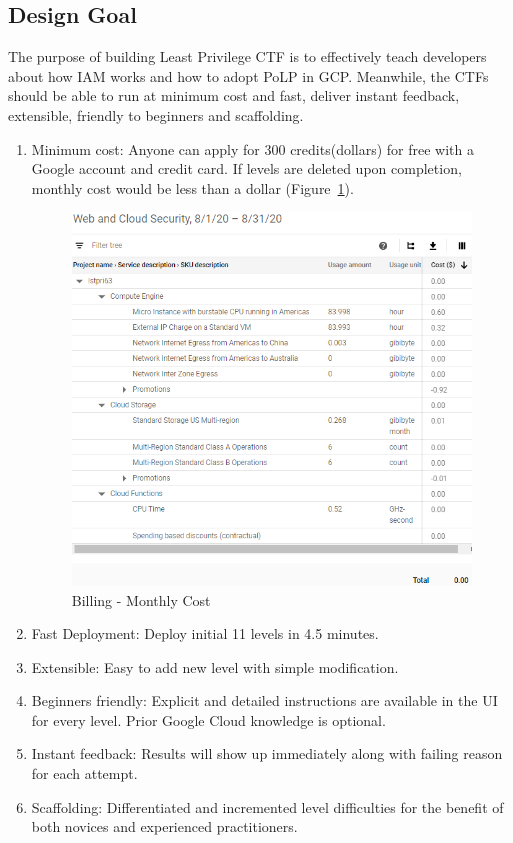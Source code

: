 \subsection{Design Goal}
The purpose of building Least Privilege CTF is to effectively teach developers about how IAM works and how to adopt PoLP in GCP. Meanwhile, the CTFs should be able to run at minimum cost and fast, deliver instant feedback, extensible, friendly to beginners and scaffolding.
\begin{enumerate}
\item Minimum cost: Anyone can apply for 300 credits(dollars) for free with a Google account and credit card. If levels are deleted upon completion, monthly cost would be less than a dollar (Figure~\ref{fig:cost}). 
\begin{figure}[!h]
  \centering
  \includegraphics[width=\linewidth]{pic/cost}
  \caption {Billing - Monthly Cost}
  \label{fig:cost}
\end{figure}
\item Fast Deployment:  Deploy initial 11 levels in 4.5 minutes.
\item Extensible: Easy to add new level with simple modification. 
\item Beginners friendly: Explicit and detailed instructions are available in the UI for every level. Prior Google Cloud knowledge is optional.
\item Instant feedback: Results will show up immediately along with failing reason for each attempt.
\item Scaffolding: Differentiated and incremented level difficulties for the benefit of both novices and experienced practitioners.

\end{enumerate}

